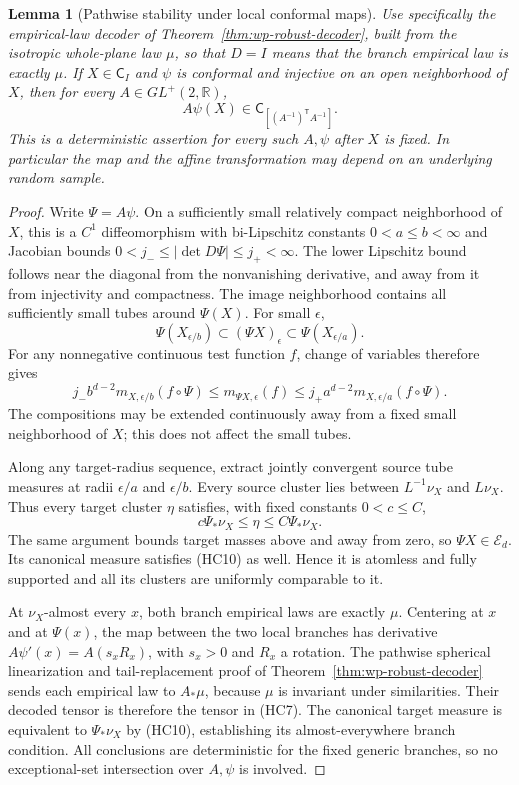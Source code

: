 \documentclass[11pt]{article}
\newtheorem{lemma}[theorem]{Lemma}
\theoremstyle{definition}\newtheorem{definition}[theorem]{Definition}
\theoremstyle{remark}\newtheorem{remark}[theorem]{Remark}
\begin{document}
\begin{lemma}[Pathwise stability under local conformal maps]
\label{lem:certificate-conformal-stability}
Use specifically the empirical-law decoder of
Theorem~\ref{thm:wp-robust-decoder}, built from the isotropic
whole-plane law $\mu$, so that $D=I$ means that the branch empirical
law is exactly $\mu$. If $X\in\mathsf C_I$ and $\psi$ is conformal
and injective on an open neighborhood of $X$, then for every
$A\in GL^+(2,\mathbb R)$,
\[
       A\psi(X)\in
       \mathsf C_{[(A^{-1})^{\mathsf T}A^{-1}]}.
       \tag{HC7}
\]
This is a deterministic assertion for every such $A,\psi$ after $X$
is fixed. In particular the map and the affine transformation may
depend on an underlying random sample.
\end{lemma}
\begin{proof}
Write $\Psi=A\psi$. On a sufficiently small relatively compact
neighborhood of $X$, this is a $C^1$ diffeomorphism with bi-Lipschitz
constants $0<a\le b<\infty$ and Jacobian bounds
$0<j_-\le|\det D\Psi|\le j_+<\infty$. The lower Lipschitz bound
follows near the diagonal from the nonvanishing derivative, and away
from it from injectivity and compactness. The image neighborhood
contains all sufficiently small tubes around $\Psi(X)$.
For small $\epsilon$,
\[
 \Psi(X_{\epsilon/b})\subset(\Psi X)_\epsilon
                         \subset\Psi(X_{\epsilon/a}).
 \tag{HC8}
\]
For any nonnegative continuous test function $f$, change of variables
therefore gives
\[
 j_-b^{d-2}m_{X,\epsilon/b}(f\circ\Psi)
 \le m_{\Psi X,\epsilon}(f)
 \le j_+a^{d-2}m_{X,\epsilon/a}(f\circ\Psi).
 \tag{HC9}
\]
The compositions may be extended continuously away from a fixed
small neighborhood of $X$; this does not affect the small tubes.

Along any target-radius sequence, extract jointly convergent source
tube measures at radii $\epsilon/a$ and $\epsilon/b$. Every source
cluster lies between $L^{-1}\nu_X$ and $L\nu_X$. Thus every
target cluster $\eta$ satisfies, with fixed constants $0<c\le C$,
\[
      c\Psi_*\nu_X\le\eta\le C\Psi_*\nu_X.
      \tag{HC10}
\]
The same argument bounds target masses above and away from zero,
so $\Psi X\in\mathcal E_d$. Its canonical measure satisfies
(HC10) as well. Hence it is atomless and fully supported and all
its clusters are uniformly comparable to it.

At $\nu_X$-almost every $x$, both branch empirical laws are
exactly $\mu$. Centering at $x$ and at $\Psi(x)$, the map between
the two local branches has derivative
$A\psi'(x)=A(s_xR_x)$, with $s_x>0$ and $R_x$ a rotation.
The pathwise spherical linearization and tail-replacement proof of
Theorem~\ref{thm:wp-robust-decoder} sends each empirical law to
$A_*\mu$, because $\mu$ is invariant under similarities.
Their decoded tensor is therefore the tensor in (HC7).
The canonical target measure is equivalent to $\Psi_*\nu_X$ by
(HC10), establishing its almost-everywhere branch condition.
All conclusions are deterministic for the fixed generic branches,
so no exceptional-set intersection over $A,\psi$ is involved.
\end{proof}
\end{document}
